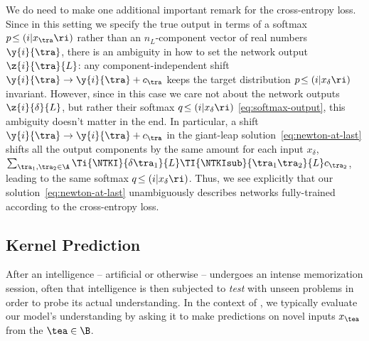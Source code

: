 We do need to make one additional important remark for the cross-entropy loss. Since in this setting we specify the true output in terms of a softmax  $p\!\le(i|x_{\tra}\ri)$ rather than an $n_L$-component vector of real numbers $\y{i}{\tra}$, there is an ambiguity in how to set the network output $\z{i}{\tra}{L}$: any component-independent shift $\y{i}{\tra}\to\y{i}{\tra}+c_{\tra}$ keeps the target distribution $p\!\le(i|x_\delta\ri)$ invariant. However, since in this case we care not about the network outputs $\z{i}{\delta}{L}$, but rather their softmax $q\!\le(i|x_\delta\ri)$ \eqref{eq:softmax-output}, this ambiguity doesn't matter in the end. In particular, a shift $\y{i}{\tra}\to\y{i}{\tra}+c_{\tra}$ in the giant-leap solution~\eqref{eq:newton-at-last} shifts all the output components by the same amount for each input $x_\delta$, $\sum_{\tra_1, \tra_2 \in\A} \Ti{\NTKI}{\delta \tra_1}{L} \TI{\NTKIsub}{\tra_1 \tra_2}{L}c_{\tra_2}$, leading to the same softmax $q\!\le(i|x_\delta\ri)$. Thus, we see explicitly that our solution~\eqref{eq:newton-at-last} unambiguously describes networks fully-trained according to the cross-entropy loss.








































 




\subsection{Kernel Prediction}\label{subsec:NTKprediction}
After an intelligence -- artificial or otherwise -- undergoes an intense memorization session, often that intelligence is then subjected to \emph{test} with unseen problems in order to probe its actual understanding. In the context of , we typically evaluate our model's understanding by asking it to make predictions on novel inputs $x_{\tea}$ from the  $\tea \in \B$. 

